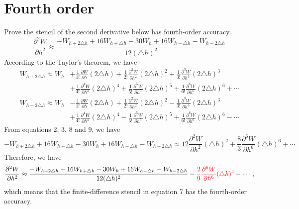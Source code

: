 \documentclass[referee]{../../../texCls/mayWithTeaser}
\begin{document}
\section{Fourth order}
Prove the stencil of the second derivative below has fourth-order accuracy.
\begin{equation}
\frac{\partial^2W}{\partial h^2}
\approx \frac{-W_{h+2\triangle h}+16W_{h+\triangle h}-30W_h+
             16W_{h-\triangle h}-W_{h-2\triangle h}}{12(\triangle h)^2}
\end{equation}
According to the Taylor's theorem, we have
\begin{equation}
\begin{split}
W_{h+2\triangle h} 
\approx W_h
&+\frac{1}{1!}\frac{\partial W}{\partial h}(2\triangle h)
 +\frac{1}{2!}\frac{\partial^2 W}{\partial h^2}(2\triangle h)^2
 +\frac{1}{3!}\frac{\partial^3 W}{\partial h^3}(2\triangle h)^3\\
&+\frac{1}{4!}\frac{\partial^4 W}{\partial h^4}(2\triangle h)^4
 +\frac{1}{5!}\frac{\partial^5 W}{\partial h^5}(2\triangle h)^5
 +\frac{1}{6!}\frac{\partial^6 W}{\partial h^6}(2\triangle h)^6
 +\cdots
\end{split}
\end{equation}
\begin{equation}
\begin{split}
W_{h-2\triangle h} 
\approx W_h
&-\frac{1}{1!}\frac{\partial W}{\partial h}(2\triangle h)
 +\frac{1}{2!}\frac{\partial^2 W}{\partial h^2}(2\triangle h)^2
 -\frac{1}{3!}\frac{\partial^3 W}{\partial h^3}(2\triangle h)^3\\
&+\frac{1}{4!}\frac{\partial^4 W}{\partial h^4}(2\triangle h)^4
 -\frac{1}{5!}\frac{\partial^5 W}{\partial h^5}(2\triangle h)^5
 +\frac{1}{6!}\frac{\partial^6 W}{\partial h^6}(2\triangle h)^6
 -\cdots
\end{split}
\end{equation}
From equations 2, 3, 8 and 9, we have
\begin{equation}
-W_{h+2\triangle h}+16W_{h+\triangle h}-30W_h+
16W_{h-\triangle h}-W_{h-2\triangle h}\approx
12\frac{\partial^2W}{\partial h^2}(\triangle h)^2+
\frac{8}{3}\frac{\partial^6 W}{\partial h^6}(\triangle h)^6+\cdots
\end{equation}
Therefore, we have
\begin{equation}
\frac{\partial^2W}{\partial h^2}\approx
\frac{-W_{h+2\triangle h}+16W_{h+\triangle h}-30W_h+
16W_{h-\triangle h}-W_{h-2\triangle h}}{12(\triangle h)^2}
-\textcolor{red}{\frac{2}{9}\frac{\partial^6 W}{\partial h^6}(\triangle
h)^4}-\cdots,
\end{equation}
which means that the finite-difference stencil in equation 7 has the
fourth-order accuracy.
\end{document}
